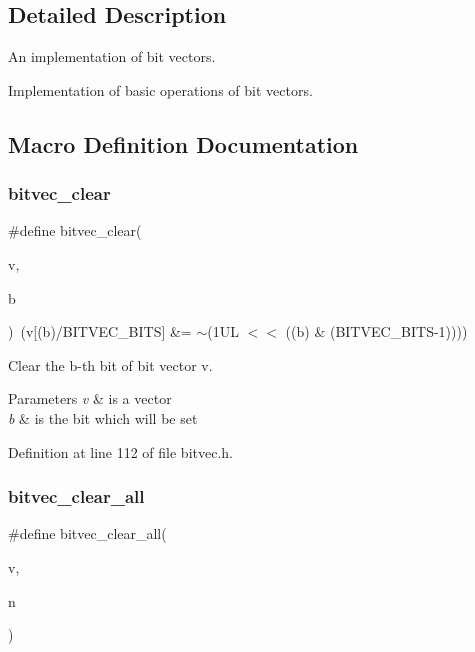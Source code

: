 \subsection{Detailed Description}
An implementation of bit vectors. 

Implementation of basic operations of bit vectors. 

\subsection{Macro Definition Documentation}
\mbox{\label{bitvec_8h_a74b3387345ca2730a8067626878843fc}} 
\subsubsection{bitvec\+\_\+clear}
{\footnotesize\ttfamily \#define bitvec\+\_\+clear(\begin{DoxyParamCaption}\item[{}]{v,  }\item[{}]{b }\end{DoxyParamCaption})~(v[(b)/B\+I\+T\+V\+E\+C\+\_\+\+B\+I\+TS] \&= $\sim$(1\+U\+L $<$$<$ ((b) \& (\+B\+I\+T\+V\+E\+C\+\_\+\+B\+I\+T\+S-\/1))))}



Clear the b-\/th bit of bit vector v. 


\begin{DoxyParams}{Parameters}
{\em v} & is a vector \\
\hline
{\em b} & is the bit which will be set \\
\hline
\end{DoxyParams}


Definition at line 112 of file bitvec.\+h.

\mbox{\label{bitvec_8h_a89f80d7a8040e9225f3c1c9bf102ae1d}} 
\subsubsection{bitvec\+\_\+clear\+\_\+all}
{\footnotesize\ttfamily \#define bitvec\+\_\+clear\+\_\+all(\begin{DoxyParamCaption}\item[{}]{v,  }\item[{}]{n }\end{DoxyParamCaption})}


